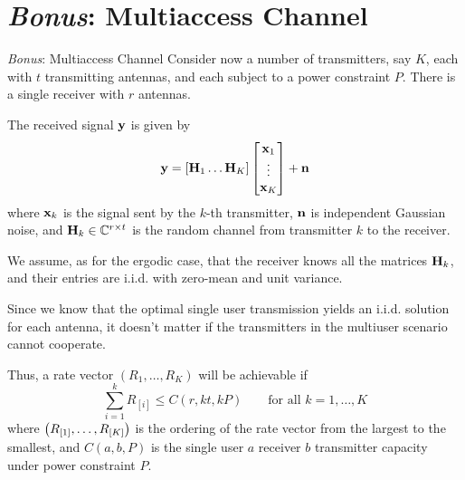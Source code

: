 \section{\protect\textit{Bonus}: Multiaccess Channel}
\begin{frame}[allowframebreaks]{\textit{Bonus}: Multiaccess Channel}
Consider now a number of transmitters, say $K$, each with $t$ transmitting antennas, and each subject to a power constraint $P$. There is a single receiver with $r$ antennas.

\medskip
The received signal $\vb{y}$ is given by
$$\vb{y} = \qty[\vb{H}_1 \ldots \vb{H}_K]
\begin{bmatrix}
\vb{x}_1 \\ 
\vdots \\ 
\vb{x}_K
\end{bmatrix} 
+\vb{n}$$
where $\vb{x}_k$ is the signal sent by the $k$-th transmitter, $\vb{n}$ is independent Gaussian noise, and $\vb{H}_k\in \mathbb{C}^{r\times t}$ is the random channel from transmitter $k$ to the receiver.

\framebreak

We assume, as for the ergodic case, that the receiver knows all the matrices $\vb{H}_k$, and their entries are i.i.d. \cscg{} with zero-mean and unit variance.

\medskip
Since we know that the optimal single user transmission yields an i.i.d. solution for each antenna, it doesn't matter if the transmitters in the multiuser scenario cannot cooperate.

\medskip
Thus, a rate vector $(R_1,\ldots,R_K)$ will be achievable if
$$\sum_{i=1}^{k} R_{[i]} \leq C(r,kt,kP) \qquad \text{for all } k=1,\ldots,K$$
where $\qty(R_{[1]},\ldots,R_{[K]})$ is the ordering of the rate vector from the largest to the smallest, and $C(a, b, P)$ is the single user
$a$ receiver $b$ transmitter capacity under power constraint $P$.

\end{frame}